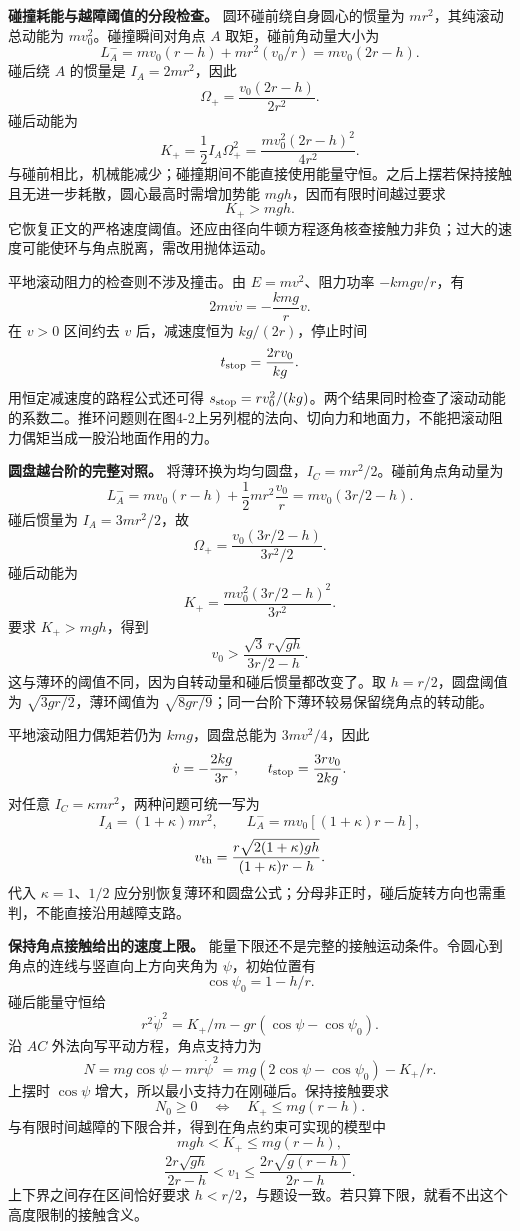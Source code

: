 \documentclass[12pt,a4paper,UTF8]{ctexart}
\begin{document}
\textbf{碰撞耗能与越障阈值的分段检查。} 圆环碰前绕自身圆心的惯量为
\(mr^2\)，其纯滚动总动能为 \(mv_0^2\)。碰撞瞬间对角点 \(A\)
取矩，碰前角动量大小为 \[
L_A^-=mv_0(r-h)+mr^2(v_0/r)=mv_0(2r-h).
\] 碰后绕 \(A\) 的惯量是 \(I_A=2mr^2\)，因此 \[
\Omega_+=\frac{v_0(2r-h)}{2r^2}.
\] 碰后动能为 \[
K_+=\frac12I_A\Omega_+^2
=\frac{mv_0^2(2r-h)^2}{4r^2}.
\]
与碰前相比，机械能减少；碰撞期间不能直接使用能量守恒。之后上摆若保持接触且无进一步耗散，圆心最高时需增加势能
\(mgh\)，因而有限时间越过要求 \[
K_+>mgh.
\]
它恢复正文的严格速度阈值。还应由径向牛顿方程逐角核查接触力非负；过大的速度可能使环与角点脱离，需改用抛体运动。

平地滚动阻力的检查则不涉及撞击。由 \(E=mv^2\)、阻力功率 \(-kmgv/r\)，有
\[
2mv\dot v=-\frac{kmg}{r}v.
\] 在 \(v>0\) 区间约去 \(v\) 后，减速度恒为 \(kg/(2r)\)，停止时间 \[
t_{\rm stop}=\frac{2rv_0}{kg}.
\] 用恒定减速度的路程公式还可得
\(s_{\rm stop}=rv_0^2/(kg)\)。两个结果同时检查了滚动动能的系数二。推环问题则在图4-2上另列棍的法向、切向力和地面力，不能把滚动阻力偶矩当成一股沿地面作用的力。

\textbf{圆盘越台阶的完整对照。}
将薄环换为均匀圆盘，\(I_C=mr^2/2\)。碰前角点角动量为 \[
L_A^-=mv_0(r-h)+\frac12mr^2\frac{v_0}{r}
=mv_0(3r/2-h).
\] 碰后惯量为 \(I_A=3mr^2/2\)，故 \[
\Omega_+=\frac{v_0(3r/2-h)}{3r^2/2}.
\] 碰后动能为 \[
K_+=\frac{mv_0^2(3r/2-h)^2}{3r^2}.
\] 要求 \(K_+>mgh\)，得到 \[
v_0>\frac{\sqrt3\,r\sqrt{gh}}{3r/2-h}.
\] 这与薄环的阈值不同，因为自转动量和碰后惯量都改变了。取
\(h=r/2\)，圆盘阈值为 \(\sqrt{3gr/2}\)，薄环阈值为
\(\sqrt{8gr/9}\)；同一台阶下薄环较易保留绕角点的转动能。

平地滚动阻力偶矩若仍为 \(kmg\)，圆盘总能为 \(3mv^2/4\)，因此 \[
\dot v=-\frac{2kg}{3r},\qquad
 t_{\rm stop}=\frac{3rv_0}{2kg}.
\] 对任意 \(I_C=\kappa mr^2\)，两种问题可统一写为 \[
I_A=(1+\kappa)mr^2,
\qquad L_A^-=mv_0[(1+\kappa)r-h],
\] \[
v_{\rm th}=\frac{r\sqrt{2(1+\kappa)gh}}{(1+\kappa)r-h}.
\] 代入 \(\kappa=1\)、\(1/2\)
应分别恢复薄环和圆盘公式；分母非正时，碰后旋转方向也需重判，不能直接沿用越障支路。

\textbf{保持角点接触给出的速度上限。}
能量下限还不是完整的接触运动条件。令圆心到角点的连线与竖直向上方向夹角为
\(\psi\)，初始位置有 \[
\cos\psi_0=1-h/r.
\] 碰后能量守恒给 \[
r^2\dot\psi^2=K_+/m-gr(\cos\psi-\cos\psi_0).
\] 沿 \(AC\) 外法向写平动方程，角点支持力为 \[
N=mg\cos\psi-mr\dot\psi^2
=mg(2\cos\psi-\cos\psi_0)-K_+/r.
\] 上摆时 \(\cos\psi\) 增大，所以最小支持力在刚碰后。保持接触要求 \[
N_0\ge0\quad\Longleftrightarrow\quad K_+\le mg(r-h).
\] 与有限时间越障的下限合并，得到在角点约束可实现的模型中 \[
mgh<K_+\le mg(r-h),
\] \[
\frac{2r\sqrt{gh}}{2r-h}<v_1
\le\frac{2r\sqrt{g(r-h)}}{2r-h}.
\] 上下界之间存在区间恰好要求
\(h<r/2\)，与题设一致。若只算下限，就看不出这个高度限制的接触含义。
\end{document}
